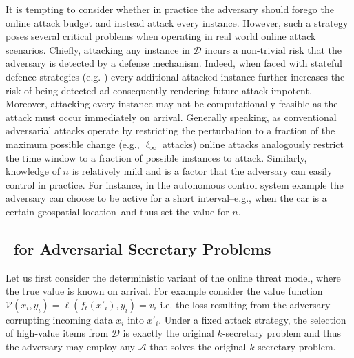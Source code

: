  It is tempting to consider whether in practice the adversary should forego the online attack budget and instead attack every instance. However, such a strategy poses several critical problems when operating in real world online attack scenarios. Chiefly, attacking any instance in $\mathcal{D}$ incurs a non-trivial risk that the adversary is detected by a defense mechanism. Indeed, when faced with stateful defence strategies (e.g. \cite{chen2020stateful}) every additional attacked instance further increases the risk of being detected ad consequently rendering future attack impotent. Moreover, attacking every instance may not be computationally feasible as the attack must occur immediately on arrival. Generally speaking, as conventional adversarial attacks operate by restricting the perturbation to a fraction of the maximum possible change (e.g., $\ell_{\infty}$ attacks) online attacks analogously restrict the time window to a fraction of possible instances to attack. Similarly, knowledge of $n$ is relatively mild and is a factor that the adversary can easily control in practice. For instance, in the autonomous control system example the adversary can choose to be active for a short interval--e.g., when the car is a certain geospatial location--and thus set the value for $n$.



\subsection{\algoname\ for Adversarial Secretary Problems}
\label{virtual_plus}
Let us first consider the deterministic variant of the online threat model, where the true value is known on arrival. For example consider the value function $\mathcal{V}(x_i,y_i) = \ell(f_{t}(x'_i),y_i) = v_i$ i.e. the loss resulting from the adversary corrupting incoming data $x_i$ into $x'_i$. Under a fixed attack strategy, the selection of high-value items from $\mathcal{D}$ is exactly the original $k$-secretary problem and thus the adversary may employ any $\mathcal{A}$ that solves the original $k$-secretary problem.

